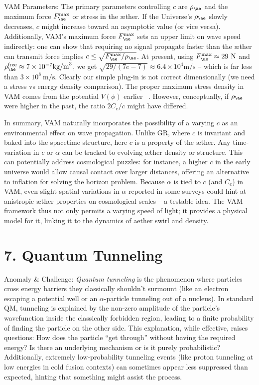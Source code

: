\documentclass[a4paper, aps,preprint,superscriptaddress, 12pt]{revtex4}
\begin{document}
VAM Parameters: The primary parameters controlling $c$ are $\rho_{\ae}$ and the maximum force $F_{\ae}^{\max}$ or stress in the æther. If the Universe’s $\rho_{\ae}$ slowly decreases, $c$ might increase toward an asymptotic value (or vice versa). Additionally, VAM’s maximum force $F_{\ae}^{\max}$ sets an upper limit on wave speed indirectly: one can show that requiring no signal propagate faster than the æther can transmit force implies $c \le \sqrt{F_{\ae}^{\max}/\rho_{\ae}}$. At present, using $F_{\ae}^{\max}\approx29~\text{N}$ and $\rho_{\ae}^{\text{free}}\approx7\times10^{-7}\text{kg/m}^3$, we get $\sqrt{29/(7e-7)}\approx6.4\times10^4\text{m/s}$ – which is far less than $3\times10^8~\text{m/s}$. Clearly our simple plug-in is not correct dimensionally (we need a stress vs energy density comparison). The proper maximum stress density in VAM comes from the potential $V(\phi)$ earlier~\cite{Iskandarani2025c} . However, conceptually, if $\rho_{\ae}$ were higher in the past, the ratio $2C_e/c$ might have differed.


In summary, VAM naturally incorporates the possibility of a varying $c$ as an environmental effect on wave propagation. Unlike GR, where $c$ is invariant and baked into the spacetime structure, here $c$ is a property of the æther. Any time-variation in $c$ or $\alpha$ can be tracked to evolving æther density or structure. This can potentially address cosmological puzzles: for instance, a higher $c$ in the early universe would allow causal contact over larger distances, offering an alternative to inflation for solving the horizon problem. Because $\alpha$ is tied to $c$ (and $C_e$) in VAM, even slight spatial variations in $\alpha$ reported in some surveys could hint at anistropic æther properties on cosmological scales – a testable idea. The VAM framework thus not only permits a varying speed of light; it provides a physical model for it, linking it to the dynamics of aether swirl and density.


\section*{7. Quantum Tunneling}

Anomaly \& Challenge: \textit{Quantum tunneling} is the phenomenon where particles cross energy barriers they classically shouldn’t surmount (like an electron escaping a potential well or an $\alpha$-particle tunneling out of a nucleus). In standard QM, tunneling is explained by the non-zero amplitude of the particle’s wavefunction inside the classically forbidden region, leading to a finite probability of finding the particle on the other side. This explanation, while effective, raises questions: How does the particle “get through” without having the required energy? Is there an underlying mechanism or is it purely probabilistic? Additionally, extremely low-probability tunneling events (like proton tunneling at low energies in cold fusion contexts) can sometimes appear less suppressed than expected, hinting that something might assist the process.
\end{document}
